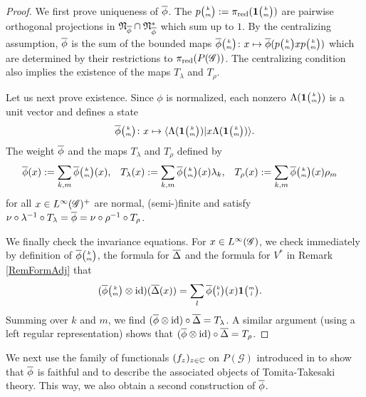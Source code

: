 \begin{proof}
  We first prove uniqueness of $\overline{\phi}$.  The
  $p{\tiny {\begin{pmatrix} k\\m\end{pmatrix}}}:=\pi_{\operatorname{\mathrm{red}}}(\mathbf{1}{\tiny {\begin{pmatrix} k\\m\end{pmatrix}}})$ are pairwise orthogonal
  projections in $\mathfrak{N}_{\overline{\phi}}\cap \mathfrak{N}_{\overline{\phi}}^*$ which sum up to $1$. By the centralizing assumption, $\overline{\phi}$ is the sum of the bounded maps
  $\overline{\phi}{\tiny {\begin{pmatrix} k\\m\end{pmatrix}}} \colon x \mapsto
  \overline{\phi}(p{\tiny {\begin{pmatrix} k\\m\end{pmatrix}}}xp{\tiny {\begin{pmatrix} k\\m\end{pmatrix}}})$ which are determined
  by their restrictions to $\pi_{\operatorname{\mathrm{red}}}(P(\mathscr{G}))$. The centralizing condition also implies the existence of the maps $T_{\lambda}$ and $T_{\rho}$. 

Let us next prove existence.  Since $\phi$ is normalized,   each nonzero
$\Lambda(\mathbf{1}{\tiny {\begin{pmatrix} k\\m\end{pmatrix}}})$ is a unit vector and defines a state
\begin{align*}
  \overline{\phi}{\tiny {\begin{pmatrix} k\\m\end{pmatrix}}} \colon x \mapsto \langle \Lambda(\mathbf{1}{\tiny {\begin{pmatrix} k\\m\end{pmatrix}}})|x \Lambda(\mathbf{1}{\tiny {\begin{pmatrix} k\\m\end{pmatrix}}})\rangle.
\end{align*}The weight $\overline{\phi}$ and the maps $T_{\lambda}$ and $T_{\rho}$
defined by
\begin{align} \label{eq:vn-weights}
  \overline{\phi}(x) &:= \sum_{k,m} \overline{\phi}{\tiny {\begin{pmatrix} k\\m\end{pmatrix}}}(x), &
    T_{\lambda}(x)&:= \sum_{k,m}
\overline{\phi}{\tiny {\begin{pmatrix} k\\m\end{pmatrix}}}(x)\lambda_{k}, & 
T_{\rho}(x)&:=
    \sum_{k,m} \overline{\phi}{\tiny {\begin{pmatrix} k\\m\end{pmatrix}}}(x)\rho_{m}
\end{align}
for all $x\in L^{\infty}(\mathscr{G})^{+}$  are normal, (semi-)finite and satisfy $\nu
\circ \lambda^{-1} \circ T_{\lambda} = \overline{\phi} = \nu \circ \rho^{-1}
\circ T_{\rho}$.

We finally check the invariance equations. For $x\in L^{\infty}(\mathscr{G})$, we check immediately by definition of $\overline{\phi}{\tiny {\begin{pmatrix} k\\m\end{pmatrix}}}$, the formula for $\overline{\Delta}$ and the formula for $V^*$ in Remark \ref{RemFormAdj} that
  \begin{align*}
    (\overline{\phi}{\tiny {\begin{pmatrix} k\\m\end{pmatrix}}}\otimes \operatorname{id})(\overline{\Delta}(x)) &= \sum_{l}
    \overline{\phi}{\tiny {\begin{pmatrix} k\\l\end{pmatrix}}}(x) \mathbf{1}{\tiny {\begin{pmatrix} m\\l\end{pmatrix}}}.
  \end{align*} Summing over $k$ and $m$, we  find $(\overline{\phi}\otimes \operatorname{id})
  \circ \overline{\Delta} = T_{\lambda}$. A similar argument (using a left regular representation) shows that
  $(\overline{\phi} \otimes \operatorname{id}) \circ \overline{\Delta}=T_{\rho}$.
\end{proof}

We next use the family of functionals $(f_{z})_{z \in \mathbb{C}}$ on
$P(\mathscr{G})$ introduced in \cite[Theorem 2.25]{DCT1} to show that
$\overline{\phi}$ is faithful and to describe the associated objects of
Tomita-Takesaki theory. This way, we  also obtain a second construction of
$\overline{\phi}$. 

